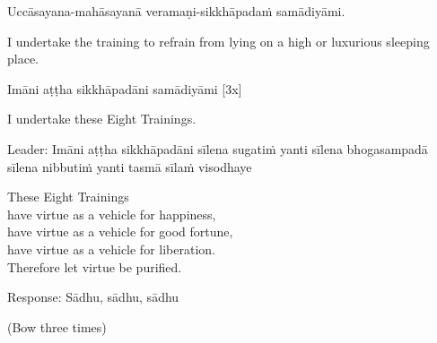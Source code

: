 Uccāsayana-mahāsayanā veramaṇi-sikkhāpadaṁ samādiyāmi.

\begin{english-verses}
  I undertake the training to refrain from lying on a high or luxurious sleeping place.
\end{english-verses}

Imāni aṭṭha sikkhāpadāni samādiyāmi \hfill{[3x]}

\begin{english-verses}
  I undertake these Eight Trainings.
\end{english-verses}

\begin{pali-hang}
  Leader: Imāni aṭṭha sikkhāpadāni sīlena sugatiṁ yanti sīlena bhogasampadā sīlena nibbutiṁ yanti tasmā sīlaṁ visodhaye
\end{pali-hang}

\begin{english-verses}
  These Eight Trainings\\
  have virtue as a vehicle for happiness,\\
  have virtue as a vehicle for good fortune,\\
  have virtue as a vehicle for liberation.\\
  Therefore let virtue be purified.\hyperlink{endnote141-appendix}{\hypertarget{endnote141-body}{}}
\end{english-verses}

Response: Sādhu, sādhu, sādhu

\begin{center}
  (Bow three times)
\end{center}

\clearpage

